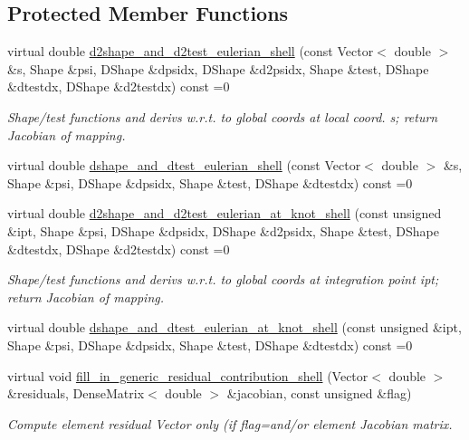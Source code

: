 \subsection*{Protected Member Functions}
\begin{DoxyCompactItemize}
\item 
virtual double \hyperlink{classoomph_1_1MyShellEquations_ae5efd29cb214218d41d29abab4dcec51}{d2shape\+\_\+and\+\_\+d2test\+\_\+eulerian\+\_\+shell} (const Vector$<$ double $>$ \&s, Shape \&psi, D\+Shape \&dpsidx, D\+Shape \&d2psidx, Shape \&test, D\+Shape \&dtestdx, D\+Shape \&d2testdx) const =0
\begin{DoxyCompactList}\small\item\em Shape/test functions and derivs w.\+r.\+t. to global coords at local coord. s; return Jacobian of mapping. \end{DoxyCompactList}\item 
virtual double \hyperlink{classoomph_1_1MyShellEquations_ac0cb5a90f9eceb2406c21c1e1dc662e7}{dshape\+\_\+and\+\_\+dtest\+\_\+eulerian\+\_\+shell} (const Vector$<$ double $>$ \&s, Shape \&psi, D\+Shape \&dpsidx, Shape \&test, D\+Shape \&dtestdx) const =0
\item 
virtual double \hyperlink{classoomph_1_1MyShellEquations_af8f15f0d678c85535bbc3390399dafdd}{d2shape\+\_\+and\+\_\+d2test\+\_\+eulerian\+\_\+at\+\_\+knot\+\_\+shell} (const unsigned \&ipt, Shape \&psi, D\+Shape \&dpsidx, D\+Shape \&d2psidx, Shape \&test, D\+Shape \&dtestdx, D\+Shape \&d2testdx) const =0
\begin{DoxyCompactList}\small\item\em Shape/test functions and derivs w.\+r.\+t. to global coords at integration point ipt; return Jacobian of mapping. \end{DoxyCompactList}\item 
virtual double \hyperlink{classoomph_1_1MyShellEquations_a0800ff2f9716a3b0327624948ce792e1}{dshape\+\_\+and\+\_\+dtest\+\_\+eulerian\+\_\+at\+\_\+knot\+\_\+shell} (const unsigned \&ipt, Shape \&psi, D\+Shape \&dpsidx, Shape \&test, D\+Shape \&dtestdx) const =0
\item 
virtual void \hyperlink{classoomph_1_1MyShellEquations_a39b639b46ce1b2fcd53465b02da47f78}{fill\+\_\+in\+\_\+generic\+\_\+residual\+\_\+contribution\+\_\+shell} (Vector$<$ double $>$ \&residuals, Dense\+Matrix$<$ double $>$ \&jacobian, const unsigned \&flag)
\begin{DoxyCompactList}\small\item\em Compute element residual Vector only (if flag=and/or element Jacobian matrix. \end{DoxyCompactList}\end{DoxyCompactItemize}
